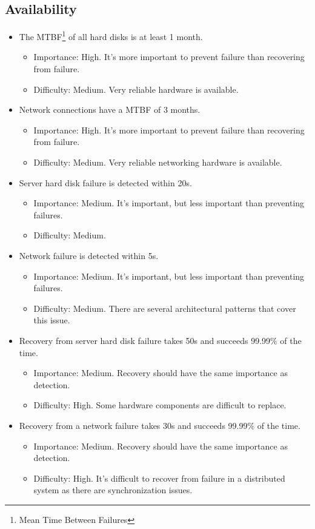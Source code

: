 \documentclass[a4paper,11pt]{report}
\begin{document}
\subsection{Availability}
\begin{itemize}
\item[\textbf{A1.1}] The MTBF\footnote{Mean Time Between Failures} of all hard disks is at least 1 month.
\begin{itemize}
\item Importance: High. It's more important to prevent failure than recovering from failure.
\item Difficulty: Medium. Very reliable hardware is available.
\end{itemize}
\item[\textbf{A1.2}] Network connections have a MTBF of 3 months.
\begin{itemize}
\item Importance: High. It's more important to prevent failure than recovering from failure.
\item Difficulty: Medium. Very reliable networking hardware is available.
\end{itemize}
\item[\textbf{A2.1}] Server hard disk failure is detected within 20s.
\begin{itemize}
\item Importance: Medium. It's important, but less important than preventing failures.
\item Difficulty: Medium.
\end{itemize}
\item[\textbf{A2.2}] Network failure is detected within 5s.
\begin{itemize}
\item Importance: Medium. It's important, but less important than preventing failures.
\item Difficulty: Medium. There are several architectural patterns that cover this issue.
\end{itemize}
\item[\textbf{A3.1}] Recovery from server hard disk failure takes 50s and succeeds 99.99\% of the time.
\begin{itemize}
\item Importance: Medium. Recovery should have the same importance as detection.
\item Difficulty: High. Some hardware components are difficult to replace.
\end{itemize}
\item[\textbf{A3.2}] Recovery from a network failure takes 30s and succeeds 99.99\% of the time.
\begin{itemize}
\item Importance: Medium. Recovery should have the same importance as detection.
\item Difficulty: High. It's difficult to recover from failure in a distributed system as there are synchronization issues.
\end{itemize}
\end{itemize}
\end{document}
